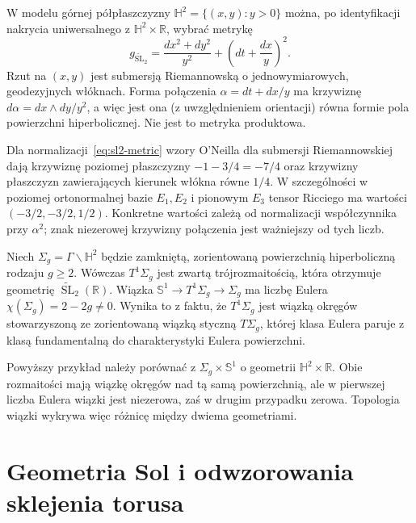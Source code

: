 W modelu górnej półpłaszczyzny $\mathbb H^2=\{(x,y):y>0\}$
można, po identyfikacji nakrycia uniwersalnego z
$\mathbb H^2\times\mathbb R$, wybrać metrykę
\begin{equation}\label{eq:sl2-metric}
 g_{\widetilde{\mathrm{SL}}_2}
 =\frac{dx^2+dy^2}{y^2}
 +\left(dt+\frac{dx}{y}\right)^2.
\end{equation}
Rzut na $(x,y)$ jest submersją Riemannowską o jednowymiarowych,
geodezyjnych włóknach. Forma połączenia
$\alpha=dt+dx/y$ ma krzywiznę
$d\alpha=dx\wedge dy/y^2$, a więc jest ona (z uwzględnieniem
orientacji) równa formie pola powierzchni hiperbolicznej.
Nie jest to metryka produktowa.

\begin{uwaga}[Krzywizny]
Dla normalizacji~\eqref{eq:sl2-metric} wzory O'Neilla dla
submersji Riemannowskiej dają krzywiznę poziomej płaszczyzny
$-1-3/4=-7/4$ oraz krzywizny płaszczyzn zawierających kierunek
włókna równe $1/4$. W szczególności w poziomej ortonormalnej
bazie $E_1,E_2$ i pionowym $E_3$ tensor Ricciego ma wartości
$(-3/2,-3/2,1/2)$. Konkretne wartości zależą od normalizacji
współczynnika przy $\alpha^2$; znak niezerowej krzywizny
połączenia jest ważniejszy od tych liczb.
\end{uwaga}

\begin{przyklad}
Niech $\Sigma_g=\Gamma\backslash\mathbb H^2$ będzie zamkniętą,
zorientowaną powierzchnią hiperboliczną rodzaju $g\ge2$.
Wówczas $T^1\Sigma_g$ jest zwartą trójrozmaitością, która otrzymuje
geometrię $\widetilde{\operatorname{SL}}_2(\mathbb R)$.
Wiązka $\mathbb S^1\to T^1\Sigma_g\to\Sigma_g$ ma liczbę
Eulera $\chi(\Sigma_g)=2-2g\neq0$. Wynika to z faktu, że
$T^1\Sigma_g$ jest wiązką okręgów stowarzyszoną ze zorientowaną
wiązką styczną $T\Sigma_g$, której klasa Eulera paruje z klasą
fundamentalną do charakterystyki Eulera powierzchni.
\end{przyklad}

Powyższy przykład należy porównać z
$\Sigma_g\times\mathbb S^1$ o geometrii
$\mathbb H^2\times\mathbb R$. Obie rozmaitości mają wiązkę okręgów
nad tą samą powierzchnią, ale w pierwszej liczba Eulera wiązki
jest niezerowa, zaś w drugim przypadku zerowa. Topologia
wiązki wykrywa więc różnicę między dwiema geometriami.

\section{Geometria Sol i odwzorowania sklejenia torusa}
\label{sec:thurston-sol}

